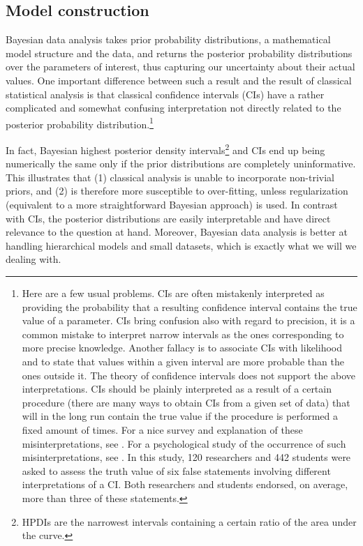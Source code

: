\documentclass{clv3}
\begin{document}
\label{sec:bayesian}

\hypertarget{model-construction}{%
\subsection{Model construction}\label{model-construction}}

\label{subsec:model}

Bayesian data analysis takes prior probability distributions, a
mathematical model structure and the data, and returns the posterior
probability distributions over the parameters of interest, thus
capturing our uncertainty about their actual values. One important
difference between such a result and the result of classical
statistical analysis is that classical confidence intervals (CIs) have a
rather complicated and somewhat confusing interpretation not directly related to the posterior probability distribution.\footnote{Here
  are a few usual problems. CIs are often mistakenly interpreted as
  providing the probability that a resulting confidence interval
  contains the true value of a parameter. CIs bring confusion also with
  regard to precision, it is a common mistake to interpret narrow
  intervals as the ones corresponding to more precise knowledge.
  Another fallacy is to associate CIs with likelihood and to state that
  values within a given interval are more probable than the ones outside
  it. The theory of confidence intervals does not support the above
  interpretations. CIs should be plainly interpreted as a result of
  a certain procedure (there are many ways to obtain CIs from a given set
  of data) that will in the long run contain the true value if the
  procedure is performed a fixed amount of times. For a nice survey and
  explanation of these misinterpretations, see \citep{Morey2015confidenceFallacy}. For a
  psychological study of the occurrence of such misinterpretations, see
  \citep{Hoekstra2014Misinterpretation}. In this study, 120 researchers and 442 students were asked to
  assess the truth value of six false statements involving different
  interpretations of a CI. Both researchers and students endorsed, on
  average, more than three of these statements.}

In fact, Bayesian highest posterior density intervals\footnote{HPDIs are  the
narrowest intervals containing a certain ratio of the area under the
curve.} and CIs end up being numerically the same only if the prior
distributions are completely uninformative. This illustrates that (1) classical analysis
is unable to incorporate non-trivial priors, and (2) is therefore more
susceptible to over-fitting, unless regularization (equivalent to a more
straightforward Bayesian approach) is used. In contrast with CIs, the
posterior distributions are easily interpretable and have direct
relevance to the question at hand. Moreover, Bayesian data analysis is
better at handling hierarchical models and small datasets, which is
exactly what we will we dealing with.
\end{document}
